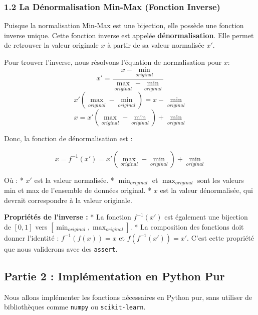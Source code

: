 \documentclass[12pt,a4paper]{report}
\newcommand{\passthrough}[1]{#1}
\begin{document}
\subsubsection{1.2 La Dénormalisation Min-Max (Fonction
Inverse)}\label{la-duxe9normalisation-min-max-fonction-inverse}

Puisque la normalisation Min-Max est une bijection, elle possède une
fonction inverse unique. Cette fonction inverse est appelée
\textbf{dénormalisation}. Elle permet de retrouver la valeur originale
\(x\) à partir de sa valeur normalisée \(x'\).

Pour trouver l'inverse, nous résolvons l'équation de normalisation pour
\(x\):
\[ x' = \frac{x - \min_{original}}{\max_{original} - \min_{original}} \]
\[ x' (\max_{original} - \min_{original}) = x - \min_{original} \]
\[ x = x' (\max_{original} - \min_{original}) + \min_{original} \]

Donc, la fonction de dénormalisation est :

\[ x = f^{-1}(x') = x' (\max_{original} - \min_{original}) + \min_{original} \]

Où : * \(x'\) est la valeur normalisée. * \(\min_{original}\) et
\(\max_{original}\) sont les valeurs min et max de l'ensemble de données
original. * \(x\) est la valeur dénormalisée, qui devrait correspondre à
la valeur originale.

\textbf{Propriétés de l'inverse :} * La fonction \(f^{-1}(x')\) est
également une bijection de \([0, 1]\) vers
\([\min_{original}, \max_{original}]\). * La composition des fonctions
doit donner l'identité : \(f^{-1}(f(x)) = x\) et \(f(f^{-1}(x')) = x'\).
C'est cette propriété que nous validerons avec des
\passthrough{\lstinline!assert!}.

\subsection{Partie 2 : Implémentation en Python
Pur}\label{partie-2-impluxe9mentation-en-python-pur}

Nous allons implémenter les fonctions nécessaires en Python pur, sans
utiliser de bibliothèques comme \passthrough{\lstinline!numpy!} ou
\passthrough{\lstinline!scikit-learn!}.
\end{document}
